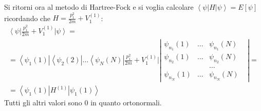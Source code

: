 Si ritorni ora al metodo di Hartree-Fock e si voglia calcolare $\left\langle \psi \right |H\left |\psi  \right\rangle=E\left[\psi \right]$ ricordando che $H=\frac{p_1^2}{2m}+V_1^{\left(1\right)}$:
\begin{equation}\begin{split}
\left\langle \psi \right |\frac{p_1^2}{2m}+V_1^{\left(1\right)}\left |\psi  \right\rangle=\\
=\left\langle \psi _1\left(1\right)\right |\left\langle \psi _2\left(2\right)\right |\dots\left\langle \psi _N\left(N\right)\right |\frac{p_1^2}{2m}+V_1^{\left(1\right)}|\left|\begin{matrix}
\psi _{n_1}\left(1\right)&\dots&\psi _{n_1}\left(N\right)\\
\psi _{n_2}\left(1\right)&\dots&\psi _{n_2}\left(N\right)\\
&&\dots& \\
\psi _{n_N}\left(1\right)&\dots&\psi _{n_N}\left(N\right)
\end{matrix}\right|=\\
=\left\langle \psi _1\left(1\right)\right |H^{\left(1\right)}\left |\psi _1\left(1\right) \right\rangle
\end{split}\end{equation}
Tutti gli altri valori sono $0$ in quanto ortonormali.